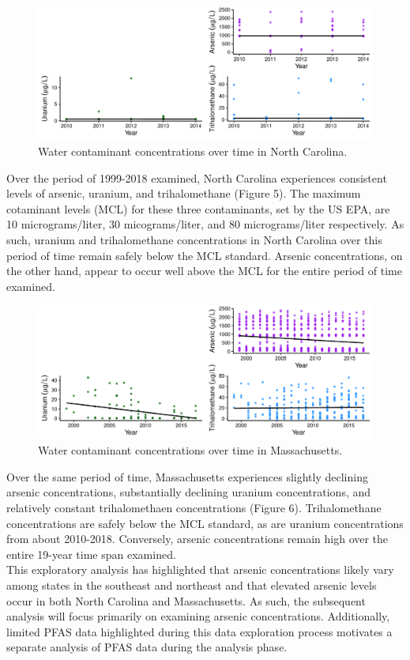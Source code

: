 \documentclass[12pt,]{article}
\begin{document}
\begin{figure}
\centering
\includegraphics{Project_Template_files/figure-latex/figs5-1.pdf}
\caption{Water contaminant concentrations over time in North Carolina.}
\end{figure}

Over the period of 1999-2018 examined, North Carolina experiences
consistent levels of arsenic, uranium, and trihalomethane (Figure 5).
The maximum cotaminant levels (MCL) for these three contaminants, set by
the US EPA, are 10 micrograms/liter, 30 micograms/liter, and 80
micrograms/liter respectively. As such, uranium and trihalomethane
concentrations in North Carolina over this period of time remain safely
below the MCL standard. Arsenic concentrations, on the other hand,
appear to occur well above the MCL for the entire period of time
examined.

\newpage

\begin{figure}
\centering
\includegraphics{Project_Template_files/figure-latex/figs6-1.pdf}
\caption{Water contaminant concentrations over time in Massachusetts.}
\end{figure}

Over the same period of time, Massachusetts experiences slightly
declining arsenic concentrations, substantially declining uranium
concentrations, and relatively constant trihalomethaen concentrations
(Figure 6). Trihalomethane concentrations are safely below the MCL
standard, as are uranium concentrations from about 2010-2018.
Conversely, arsenic concentrations remain high over the entire 19-year
time span examined.\\
This exploratory analysis has highlighted that arsenic concentrations
likely vary among states in the southeast and northeast and that
elevated arsenic levels occur in both North Carolina and Massachusetts.
As such, the subsequent analysis will focus primarily on examining
arsenic concentrations. Additionally, limited PFAS data highlighted
during this data exploration process motivates a separate analysis of
PFAS data during the analysis phase.
\end{document}
